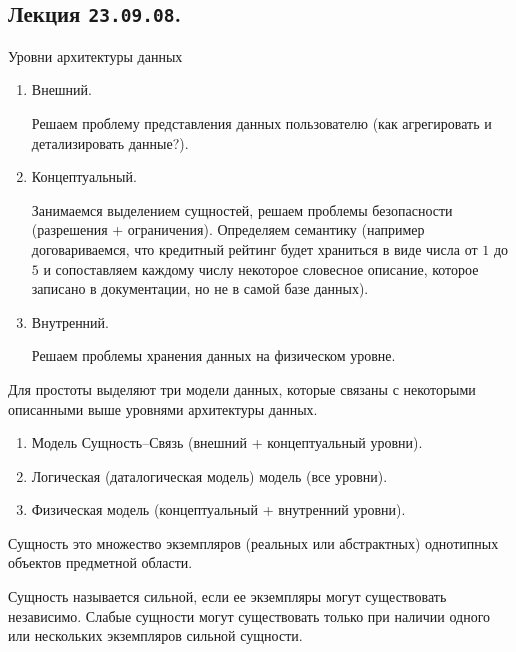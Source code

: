\subsection{%
  Лекция \texttt{23.09.08}.%
}

Уровни архитектуры данных

\begin{enumerate}
\item
  Внешний.

  Решаем проблему представления данных пользователю (как агрегировать и
  детализировать данные?).

\item
  Концептуальный.

  Занимаемся выделением сущностей, решаем проблемы безопасности (разрешения +
  ограничения). Определяем семантику (например договариваемся, что кредитный
  рейтинг будет храниться в виде числа от \(1\) до \(5\) и сопоставляем каждому
  числу некоторое словесное описание, которое записано в документации, но не в
  самой базе данных).

\item
  Внутренний.

  Решаем проблемы хранения данных на физическом уровне.
\end{enumerate}

Для простоты выделяют три модели данных, которые связаны с некоторыми описанными
выше уровнями архитектуры данных.

\begin{enumerate}
\item
  Модель Сущность--Связь (внешний + концептуальный уровни).

\item
  Логическая (даталогическая модель) модель (все уровни).

\item
  Физическая модель (концептуальный + внутренний уровни).
\end{enumerate}


\begin{definition}
  Сущность это множество экземпляров (реальных или абстрактных) однотипных
  объектов предметной области.
\end{definition}

\begin{definition}
  Сущность называется сильной, если ее экземпляры могут существовать независимо.
  Слабые сущности могут существовать только при наличии одного или нескольких 
  экземпляров сильной сущности.
\end{definition}

